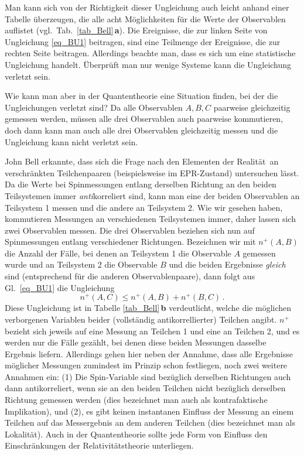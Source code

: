Man kann sich von der Richtigkeit dieser Ungleichung auch
leicht anhand einer Tabelle \"uberzeugen, die
alle acht M\"oglichkeiten f\"ur die Werte der Observablen
auflistet (vgl.\ Tab.\ \ref{tab_Bell}\,\textbf{a}). Die Ereignisse, die
zur linken Seite von Ungleichung \ref{eq_BU1} beitragen, sind eine 
Teilmenge der Ereignisse, die zur rechten Seite beitragen. 
Allerdings beachte man, dass es sich um eine statistische
Ungleichung handelt. \"Uberpr\"uft man nur wenige Systeme
kann die Ungleichung verletzt sein. 

Wie kann man aber in der Quantentheorie eine Situation
finden, bei der die Ungleichungen verletzt sind? Da alle Observablen
$A,B,C$ paarweise gleichzeitig gemessen werden, m\"ussen
alle drei Observablen auch paarweise kommutieren, doch dann kann
man auch alle drei Observablen gleichzeitig messen und die
Ungleichung kann nicht verletzt sein. 

John Bell erkannte, dass sich die Frage nach den \glqq Elementen der
Realit\"at\grqq\ an verschr\"ankten Teilchenpaaren
(beispielsweise im EPR-Zustand)  untersuchen l\"asst.  Da die
Werte bei Spinmessungen entlang derselben Richtung an den
beiden Teil\-sys\-temen immer {\em anti}korreliert sind, 
kann man eine der beiden Observablen an 
Teilsystem 1 messen und die andere an Teilsystem
2. Wie wir gesehen haben, kommutieren Messungen an verschiedenen
Teilsystemen immer, daher lassen sich zwei Observablen messen. 
Die drei Observablen beziehen sich nun auf Spinmessungen entlang
verschiedener Richtungen. Bezeichnen wir mit
$n^+(A,B)$ die Anzahl der F\"alle,
bei denen an Teilsystem 1 die Observable $A$ gemessen
wurde und an Teilsystem 2 die Observable $B$ und
die beiden Ergebnisse {\em gleich} sind (entsprechend f\"ur die
anderen Observablenpaare), dann folgt
aus Gl.\ \ref{eq_BU1} die Ungleichung
\begin{equation}
\label{eq_BU2}
     n^+(A,C) \leq n^+(A,B) + n^+(B,C)  \, .
\end{equation}
Diese Ungleichung ist in Tabelle \ref{tab_Bell}\,\textbf{b} 
verdeutlicht, welche die m\"oglichen verborgenen Variablen
beider (vollst\"andig antikorrellierter)
Teilchen angibt. $n^+$ bezieht sich jeweils
auf eine Messung an Teilchen 1 und eine an Teilchen 2,
und es werden nur die F\"alle gez\"ahlt, bei denen diese
beiden Messungen dasselbe Ergebnis liefern. Allerdings
gehen hier neben der Annahme, dass alle Ergebnisse
m\"oglicher Messungen zumindest im Prinzip schon
festliegen, noch zwei weitere Annahmen ein: (1) Die Spin-Variable
sind bez\"uglich derselben Richtungen auch dann antikorreliert, 
wenn sie an den beiden Teilchen nicht bez\"uglich derselben Richtung 
gemessen werden (dies bezeichnet man auch als
\glqq kontrafaktische Implikation\grqq),
und (2), es gibt keinen instantanen Einfluss der Messung
an einem Teilchen auf das Mess\-ergeb\-nis an dem anderen
Teilchen (dies bezeichnet man als \glqq Lokalit\"at\grqq).
Auch in der Quantentheorie sollte jede Form von Einfluss
den Einschr\"ankungen der Relativit\"atstheorie unterliegen.

